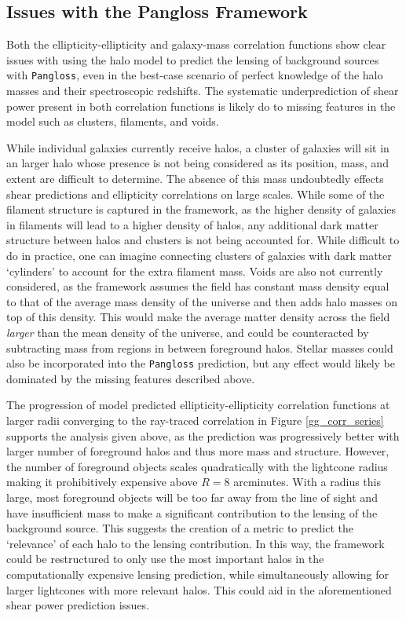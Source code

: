 \documentclass[%
 reprint,
 amsmath,amssymb,
 aps,nofootinbib
]{revtex4-1}
\begin{document}
\subsection*{Issues with the Pangloss Framework}

Both the ellipticity-ellipticity and galaxy-mass correlation functions show clear issues with using the halo model to predict the lensing of background sources with \texttt{Pangloss}, even in the best-case scenario of perfect knowledge of the halo masses and their spectroscopic redshifts. The systematic underprediction of shear power present in both correlation functions is likely do to missing features in the model such as clusters, filaments, and voids.

While individual galaxies currently receive halos, a cluster of galaxies will sit in an larger halo whose presence is not being considered as its position, mass, and extent are difficult to determine. The absence of this mass undoubtedly effects shear predictions and ellipticity correlations on large scales. While some of the filament structure is captured in the framework, as the higher density of galaxies in filaments will lead to a higher density of halos, any additional dark matter structure between halos and clusters is not being accounted for. While difficult to do in practice, one can imagine connecting clusters of galaxies with dark matter `cylinders' to account for the extra filament mass. Voids are also not currently considered, as the framework assumes the field has constant mass density equal to that of the average mass density of the universe and then adds halo masses on top of this density. This would make the average matter density across the field \textit{larger} than the mean density of the universe, and could be counteracted by subtracting mass from regions in between foreground halos. Stellar masses could also be incorporated into the \texttt{Pangloss} prediction, but any effect would likely be dominated by the missing features described above.

The progression of model predicted ellipticity-ellipticity correlation functions at larger radii converging to the ray-traced correlation in Figure \ref{gg_corr_series} supports the analysis given above, as the prediction was progressively better with larger number of foreground halos and thus more mass and structure. However, the number of foreground objects scales quadratically with the lightcone radius making it prohibitively expensive above $R=8$ arcminutes. With a radius this large, most foreground objects will be too far away from the line of sight and have insufficient mass to make a significant contribution to the lensing of the background source. This suggests the creation of a metric to predict the `relevance' of each halo to the lensing contribution. In this way, the framework could be restructured to only use the most important halos in the computationally expensive lensing prediction, while simultaneously allowing for larger lightcones with more relevant halos. This could aid in the aforementioned shear power prediction issues.
\end{document}
